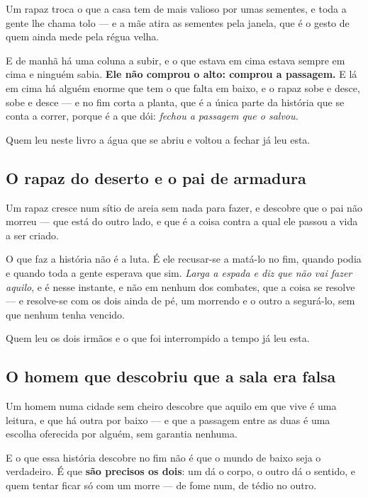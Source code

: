\documentclass[livro.tex]{subfiles}
\begin{document}
Um rapaz troca o que a casa tem de mais valioso por umas sementes, e toda a gente lhe chama tolo
--- e a mãe atira as sementes pela janela, que é o gesto de quem ainda mede pela régua velha.

\medskip

E de manhã há uma coluna a subir, e o que estava em cima estava sempre em cima e ninguém sabia.
\textbf{Ele não comprou o alto: comprou a passagem.} E lá em cima há alguém enorme que tem o que
falta em baixo, e o rapaz sobe e desce, sobe e desce --- e no fim corta a planta, que é a única
parte da história que se conta a correr, porque é a que dói: \emph{fechou a passagem que o
salvou.}

\medskip

Quem leu neste livro a água que se abriu e voltou a fechar já leu esta.

\subsection*{O rapaz do deserto e o pai de armadura}

Um rapaz cresce num sítio de areia sem nada para fazer, e descobre que o pai não morreu --- que
está do outro lado, e que é a coisa contra a qual ele passou a vida a ser criado.

\medskip

O que faz a história não é a luta. É ele recusar-se a matá-lo no fim, quando podia e quando toda a
gente esperava que sim. \emph{Larga a espada e diz que não vai fazer aquilo}, e é nesse instante,
e não em nenhum dos combates, que a coisa se resolve --- e resolve-se com os dois ainda de pé, um
morrendo e o outro a segurá-lo, sem que nenhum tenha vencido.

\medskip

Quem leu os dois irmãos e o que foi interrompido a tempo já leu esta.

\subsection*{O homem que descobriu que a sala era falsa}

Um homem numa cidade sem cheiro descobre que aquilo em que vive é uma leitura, e que há outra por
baixo --- e que a passagem entre as duas é uma escolha oferecida por alguém, sem garantia nenhuma.

\medskip

E o que essa história descobre no fim não é que o mundo de baixo seja o verdadeiro. É que
\textbf{são precisos os dois}: um dá o corpo, o outro dá o sentido, e quem tentar ficar só com um
morre --- de fome num, de tédio no outro.
\end{document}
